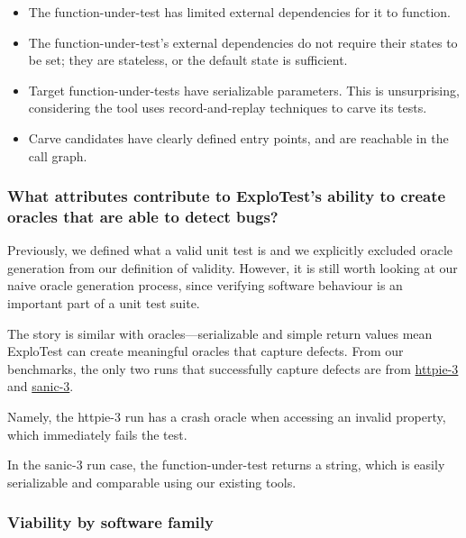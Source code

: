 \begin{itemize}
    \item The function-under-test has limited external dependencies for it to function.
    \item The function-under-test's external dependencies do not require their states to be set; they
          are stateless, or the default state is sufficient.

    \item Target function-under-tests have serializable parameters. This is unsurprising, considering
          the tool uses record-and-replay techniques to carve its tests.
    \item Carve candidates have clearly defined entry points, and are reachable in the call graph.
\end{itemize}


\subsubsection{What attributes contribute to ExploTest's ability to create oracles that are able to detect bugs?}

Previously, we defined what a valid unit test is and we explicitly excluded oracle generation from our definition of validity.
However, it is still worth looking at our naive oracle generation process, since verifying software behaviour is an important
part of a unit test suite.

The story is similar with oracles---serializable and simple return values mean ExploTest can create meaningful oracles
that capture defects.
From our benchmarks, the only two runs that successfully capture defects are from \hyperref[sec:httpie-fully-functional-ut]{httpie-3}
and \hyperref[sec:sanic-fully-functional-ut]{sanic-3}.

Namely, the httpie-3 run has a crash oracle when accessing an invalid property, which immediately fails the test.

In the sanic-3 run case, the function-under-test returns a string, which is easily serializable and comparable using our existing tools.

\subsubsection{Viability by software family}

